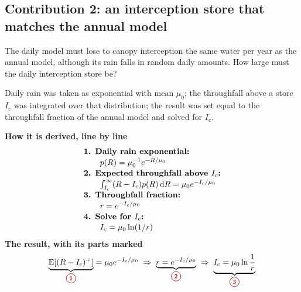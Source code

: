 \subsection{Contribution 2: an interception store that matches the annual model}\label{con:s2:2}
\begin{problem}
The daily model must lose to canopy interception the same water per year as the annual model, although its rain falls in random daily amounts. How large must the daily interception store be?
\end{problem}
\begin{derivation}
Daily rain was taken as exponential with mean $\mu_0$; the throughfall above a store $I_c$ was integrated over that distribution; the result was set equal to the throughfall fraction of the annual model and solved for $I_c$.
\end{derivation}
\begin{keyresult}
\begin{pencil}
{\small\noindent\textbf{How it is derived, line by line}
\[\begin{array}{@{}l@{}}\textbf{1. Daily rain exponential:}\\[1pt]
\qquad p(R)=\mu_0^{-1}e^{-R/\mu_0}\\[1pt]
\textbf{2. Expected throughfall above } I_c\textbf{:}\\[1pt]
\qquad \textstyle\int_{I_c}^\infty(R-I_c)p(R)\,\dd R=\mu_0e^{-I_c/\mu_0}\\[1pt]
\textbf{3. Throughfall fraction:}\\[1pt]
\qquad r=e^{-I_c/\mu_0}\\[1pt]
\textbf{4. Solve for } I_c\textbf{:}\\[1pt]
\qquad I_c=\mu_0\ln(1/r)
\end{array}\]}
\noindent\textbf{The result, with its parts marked}
\[\underbrace{\mathrm E[(R-I_c)^+]}_{\circled{1}}=\mu_0e^{-I_c/\mu_0}\;\Rightarrow\;\underbrace{r=e^{-I_c/\mu_0}}_{\circled{2}}\;\Rightarrow\;\underbrace{I_c=\mu_0\ln\frac1r}_{\circled{3}}\]
\end{pencil}
\end{keyresult}
\begin{pins}
\end{pins}


